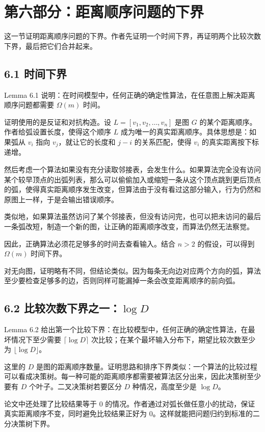 \documentclass[UTF8]{ctexart}
\begin{document}
\section*{第六部分：距离顺序问题的下界}

这一节证明距离顺序问题的下界。作者先证明一个时间下界，再证明两个比较次数下界，最后把它们合并起来。

\subsection*{6.1 时间下界}

Lemma 6.1 说明：在时间模型中，任何正确的确定性算法，在任意图上解决距离顺序问题都需要 \(\Omega(m)\) 时间。

证明使用的是反证和对抗构造。设 \(L=[v_1,v_2,\ldots,v_n]\) 是图 \(G\) 的某个距离顺序。作者给弧设置长度，使得这个顺序 \(L\) 成为唯一的真实距离顺序。具体思想是：如果弧从 \(v_i\) 指向 \(v_j\)，就让它的长度和 \(j-i\) 的关系匹配，使得 \(v_i\) 的真实距离按下标递增。

然后考虑一个算法如果没有充分读取邻接表，会发生什么。如果算法完全没有访问某个较早顶点的出弧列表，那么可以偷偷加入或缩短一条从这个顶点跳到更后顶点的弧，使得真实距离顺序发生改变，但算法由于没有看过这部分输入，行为仍然和原图上一样，于是会输出错误顺序。

类似地，如果算法虽然访问了某个邻接表，但没有访问完，也可以把未访问的最后一条弧改短，制造一个新的图，让正确的距离顺序改变，而算法仍然无法察觉。

因此，正确算法必须花足够多的时间去查看输入。结合 \(n>2\) 的假设，可以得到 \(\Omega(m)\) 时间下界。

对无向图，证明略有不同，但结论类似。因为每条无向边对应两个方向的弧，算法至少要检查足够多的边，否则同样可能漏掉一条会改变距离顺序的前向弧。

\subsection*{6.2 比较次数下界之一：\(\log D\)}

Lemma 6.2 给出第一个比较下界：在比较模型中，任何正确的确定性算法，在最坏情况下至少需要 \(\lceil \log D\rceil\) 次比较；在某个最坏输入分布下，期望比较次数至少为 \(\lfloor \log D\rfloor\)。

这里的 \(D\) 是图的距离顺序数量。证明思路和排序下界类似：一个算法的比较过程可以看成决策树。每一种可能的距离顺序都需要被算法区分出来，因此决策树至少要有 \(D\) 个叶子。二叉决策树若要区分 \(D\) 种情况，高度至少是 \(\log D\)。

论文中还处理了比较结果等于 0 的情况。作者通过对弧长做任意小的扰动，保证真实距离顺序不变，同时避免比较结果正好为 0。这样就能把问题归约到标准的二分决策树下界。
\end{document}
